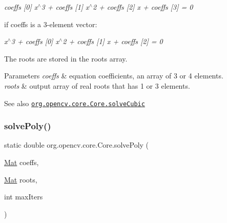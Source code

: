 {\itshape coeffs \mbox{[}0\mbox{]} x$^\wedge$3 + coeffs \mbox{[}1\mbox{]} x$^\wedge$2 + coeffs \mbox{[}2\mbox{]} x + coeffs \mbox{[}3\mbox{]} = 0}


\begin{DoxyItemize}
\item if {\ttfamily coeffs} is a 3-\/element vector\+: 
\end{DoxyItemize}

{\itshape x$^\wedge$3 + coeffs \mbox{[}0\mbox{]} x$^\wedge$2 + coeffs \mbox{[}1\mbox{]} x + coeffs \mbox{[}2\mbox{]} = 0}

The roots are stored in the {\ttfamily roots} array.


\begin{DoxyParams}{Parameters}
{\em coeffs} & equation coefficients, an array of 3 or 4 elements. \\
\hline
{\em roots} & output array of real roots that has 1 or 3 elements.\\
\hline
\end{DoxyParams}
\begin{DoxySeeAlso}{See also}
\href{http://docs.opencv.org/modules/core/doc/operations_on_arrays.html#solvecubic}{\tt org.\+opencv.\+core.\+Core.\+solve\+Cubic} 
\end{DoxySeeAlso}
\mbox{\label{classorg_1_1opencv_1_1core_1_1_core_afff6c36fd7aad820639aa8de5b52a5f7}} 
\subsubsection{\texorpdfstring{solve\+Poly()}{solvePoly()}\hspace{0.1cm}{\footnotesize\ttfamily [1/2]}}
{\footnotesize\ttfamily static double org.\+opencv.\+core.\+Core.\+solve\+Poly (\begin{DoxyParamCaption}\item[{\mbox{\hyperlink{classorg_1_1opencv_1_1core_1_1_mat}{Mat}}}]{coeffs,  }\item[{\mbox{\hyperlink{classorg_1_1opencv_1_1core_1_1_mat}{Mat}}}]{roots,  }\item[{int}]{max\+Iters }\end{DoxyParamCaption})\hspace{0.3cm}{\ttfamily [static]}}

